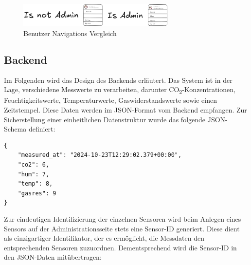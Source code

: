 \begin{inhalt}
\begin{figure}[!htb] 
\centering 
\includegraphics[width=0.7\textwidth]{files/Thomas/pics/Design-Grundlagen/Frontend/Sidebar/sidebar-nav-user-adminvsnotadmin.png} 
\caption[Bildbezeichnung für Abbildungsverzeichnis]{Benutzer Navigations Vergleich} 
\label{fig:gehaeuse_internet_bild} 
\end{figure}

\newpage

































\subsection{Backend}
\label{ref:backend_design}

Im Folgenden wird das Design des Backends erläutert. Das System ist in der Lage, verschiedene Messwerte zu verarbeiten, darunter CO\textsubscript{2}-Konzentrationen, Feuchtigkeitswerte, Temperaturwerte, Gaswiderstandswerte sowie einen Zeitstempel. Diese Daten werden im JSON-Format vom Backend empfangen. Zur Sicherstellung einer einheitlichen Datenstruktur wurde das folgende JSON-Schema definiert:

\begin{lstlisting}[style=myjson]
{
    "measured_at": "2024-10-23T12:29:02.379+00:00",
    "co2": 6,
    "hum": 7,
    "temp": 8,
    "gasres": 9
}
\end{lstlisting}

\vspace{3cm}

Zur eindeutigen Identifizierung der einzelnen Sensoren wird beim Anlegen eines Sensors auf der Administrationsseite stets eine Sensor-ID generiert. Diese dient als einzigartiger Identifikator, der es ermöglicht, die Messdaten den entsprechenden Sensoren zuzuordnen. Dementsprechend wird die Sensor-ID in den JSON-Daten mitübertragen:


\end{inhalt}
